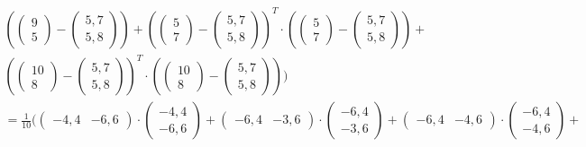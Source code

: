 \documentclass[a4paper,parskip=full-]{article}
\begin{document}
\begin{multline}
\left( \begin{pmatrix}  9 \\  5 \end{pmatrix} - \begin{pmatrix} 5,7 \\ 5,8 \end{pmatrix} \right) + 
\left( \begin{pmatrix}  5 \\  7 \end{pmatrix} - \begin{pmatrix} 5,7 \\ 5,8 \end{pmatrix} \right)^T \cdot
\left( \begin{pmatrix}  5 \\  7 \end{pmatrix} - \begin{pmatrix} 5,7 \\ 5,8 \end{pmatrix} \right) + \\
\left( \begin{pmatrix} 10 \\  8 \end{pmatrix} - \begin{pmatrix} 5,7 \\ 5,8 \end{pmatrix} \right)^T \cdot
\left( \begin{pmatrix} 10 \\  8 \end{pmatrix} - \begin{pmatrix} 5,7 \\ 5,8 \end{pmatrix} \right) 
\Biggr) \\
= \frac{1}{10} \Biggl(
\begin{pmatrix} -4,4 &  -6,6 \end{pmatrix} \cdot
\begin{pmatrix} -4,4 \\ -6,6 \end{pmatrix} +
\begin{pmatrix} -6,4 &  -3,6 \end{pmatrix} \cdot
\begin{pmatrix} -6,4 \\ -3,6 \end{pmatrix} +
\begin{pmatrix} -6,4 &  -4,6 \end{pmatrix} \cdot
\begin{pmatrix} -6,4 \\ -4,6 \end{pmatrix} + \\

\end{multline}
\end{document}
